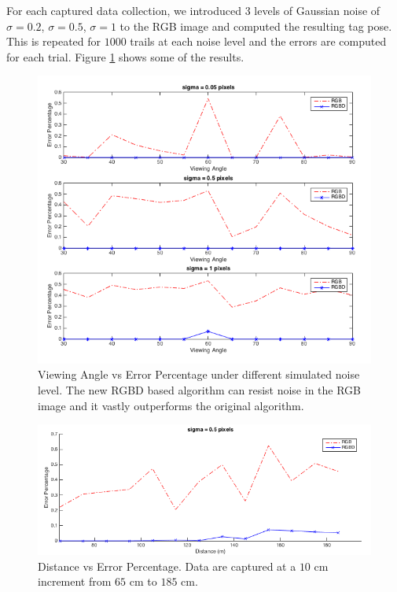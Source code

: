 For each captured data collection, we introduced 3 levels of Gaussian noise of $\sigma = 0.2$, $\sigma = 0.5$, $\sigma = 1$  to the RGB image and computed the resulting tag pose. This is repeated for $1000$ trails at each noise level and the errors are computed for each trial. Figure \ref{fig:viewing_result} shows some of the results. 
\begin{figure}
\centering
\includegraphics[width=\columnwidth]{figs/viewing_angle_fig1}
\caption{Viewing Angle vs Error Percentage under different simulated noise level. The new RGBD based algorithm can resist noise in the RGB image and it vastly outperforms the original algorithm.}
\label{fig:viewing_result}
\end{figure}

\begin{figure}
\centering
\includegraphics[width=\columnwidth]{figs/distance_fig1}
\caption{Distance vs Error Percentage. Data are captured at a $10$ cm increment from $65$ cm to $185$ cm.}
\label{fig:distance_result}
\end{figure}

